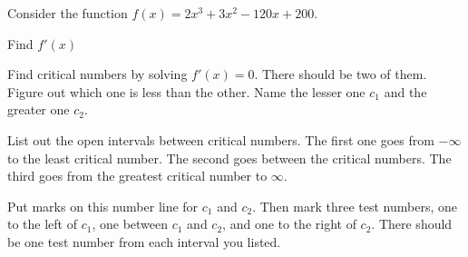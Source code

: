 \label{sec:gr-with-fp}

Consider the function $f(x) = 2x^3 + 3x^2 - 120x + 200$.

\begin{ProblemSet}

 \begin{Problem}
  Find $f'(x)$
 \end{Problem}

 \begin{Problem}[pencil space=3in]
  Find critical numbers by solving $f'(x) = 0$.
  There should be two of them.
  Figure out which one is less than the other.
  Name the lesser one $c_1$ and the greater one $c_2$.
 \end{Problem}

 \begin{Problem}
  List out the open intervals between critical numbers.
  The first one goes from $-\infty$ to the least critical number.
  The second goes between the critical numbers.
  The third goes from the greatest critical number to $\infty$.
 \end{Problem}

 \newpage

 \begin{Problem}[pencil space=0in]
  Put marks on this number line for $c_1$ and $c_2$.
  Then mark three test numbers, one to the left of $c_1$,
  one between $c_1$ and $c_2$,
  and one to the right of $c_2$.
  There should be one test number from each interval you listed.

 \end{Problem}


\end{ProblemSet}
